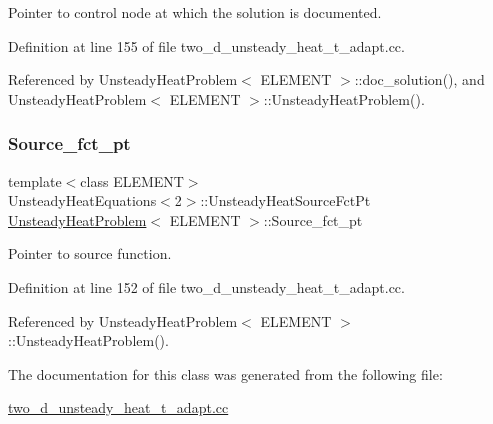 Pointer to control node at which the solution is documented. 



Definition at line 155 of file two\+\_\+d\+\_\+unsteady\+\_\+heat\+\_\+t\+\_\+adapt.\+cc.



Referenced by Unsteady\+Heat\+Problem$<$ E\+L\+E\+M\+E\+N\+T $>$\+::doc\+\_\+solution(), and Unsteady\+Heat\+Problem$<$ E\+L\+E\+M\+E\+N\+T $>$\+::\+Unsteady\+Heat\+Problem().

\mbox{\label{classUnsteadyHeatProblem_a09c5c208069fcf5f36d54f994bd54e93}} 
\subsubsection{\texorpdfstring{Source\+\_\+fct\+\_\+pt}{Source\_fct\_pt}}
{\footnotesize\ttfamily template$<$class E\+L\+E\+M\+E\+NT$>$ \\
Unsteady\+Heat\+Equations$<$2$>$\+::Unsteady\+Heat\+Source\+Fct\+Pt \hyperlink{classUnsteadyHeatProblem}{Unsteady\+Heat\+Problem}$<$ E\+L\+E\+M\+E\+NT $>$\+::Source\+\_\+fct\+\_\+pt\hspace{0.3cm}{\ttfamily [private]}}



Pointer to source function. 



Definition at line 152 of file two\+\_\+d\+\_\+unsteady\+\_\+heat\+\_\+t\+\_\+adapt.\+cc.



Referenced by Unsteady\+Heat\+Problem$<$ E\+L\+E\+M\+E\+N\+T $>$\+::\+Unsteady\+Heat\+Problem().



The documentation for this class was generated from the following file\+:\begin{DoxyCompactItemize}
\item 
\hyperlink{two__d__unsteady__heat__t__adapt_8cc}{two\+\_\+d\+\_\+unsteady\+\_\+heat\+\_\+t\+\_\+adapt.\+cc}\end{DoxyCompactItemize}
